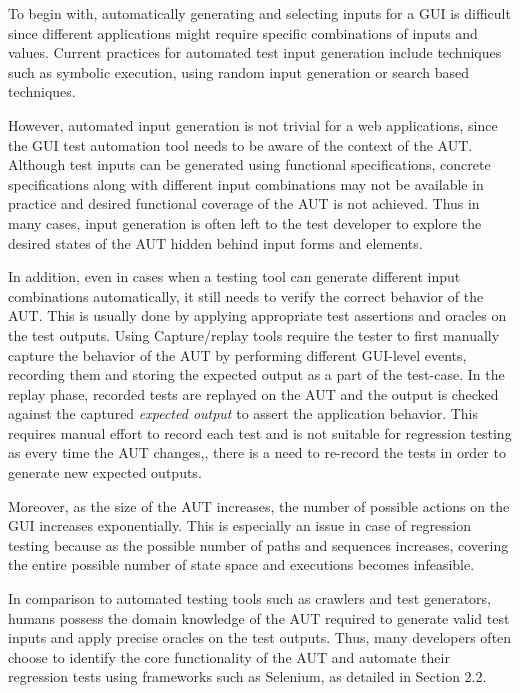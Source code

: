 To begin with, automatically generating and selecting inputs for a GUI is difficult since different applications might require specific combinations of inputs and values. 
Current practices for automated test input generation include techniques such as symbolic execution\cite{Ganovetal}, using random input generation\cite{godefroid2005dart} or search based techniques\cite{gross2012search}.

However, automated input generation is not trivial for a web applications, since the GUI test automation tool needs to be aware of the context of the AUT. Although test inputs can be generated using functional specifications, concrete specifications along with different input combinations may not be available in practice and desired functional coverage of the AUT is not achieved. Thus in many cases, input generation is often left to the test developer to explore the desired states of the AUT hidden behind input forms and elements.

In addition, even in cases when a testing tool can generate different input combinations automatically, it still needs to verify the correct behavior of the AUT. This is usually done by applying appropriate test assertions and oracles on the test outputs\cite{Baresi:Oracles}. Using Capture/replay tools\cite{joshi2006capture} require the tester to first manually capture the behavior of the AUT by performing different GUI-level events, recording them and storing the expected output as a part of the test-case. In the replay phase, recorded tests are replayed on the AUT and the output is checked against the captured \textit{expected output} to assert the application behavior. This requires manual effort to record each test and is not suitable for regression testing as every time the AUT changes\cite{sjosten2006costs},\cite{leotta2013capture}, there is a need to re-record the tests in order to generate new expected outputs. 

Moreover, as the size of the AUT increases, the number of possible actions on the GUI increases exponentially. This is especially an issue in case of regression testing because as the possible number of paths and sequences increases, covering the entire possible number of state space and executions becomes infeasible.

In comparison to automated testing tools such as crawlers and test generators, humans possess the domain knowledge of the AUT required to generate valid test inputs and apply precise oracles on the test outputs. Thus, many developers often choose to identify the core functionality of the AUT and automate their regression tests using frameworks such as Selenium\cite{websiteSelenium}, as detailed in Section 2.2.

